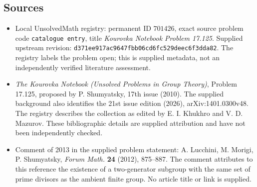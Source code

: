 \documentclass[11pt]{article}
\begin{document}
\subsection{Sources}
\begin{itemize}
\item Local UnsolvedMath registry: permanent ID \(701426\), exact source problem code \texttt{catalogue entry}, title \emph{Kourovka Notebook Problem 17.125}. Supplied upstream revision: \texttt{d371ee917ac9647fbb06cd6fc529deec6f3dda82}. The registry labels the problem open; this is supplied metadata, not an independently verified literature assessment.
\item \emph{The Kourovka Notebook (Unsolved Problems in Group Theory)}, Problem 17.125, proposed by P. Shumyatsky, 17th issue (2010). The supplied background also identifies the 21st issue edition (2026), arXiv:1401.0300v48. The registry describes the collection as edited by E. I. Khukhro and V. D. Mazurov. These bibliographic details are supplied attribution and have not been independently checked.
\item Comment of 2013 in the supplied problem statement: A. Lucchini, M. Morigi, P. Shumyatsky, \emph{Forum Math.} \textbf{24} (2012), 875--887. The comment attributes to this reference the existence of a two-generator subgroup with the same set of prime divisors as the ambient finite group. No article title or link is supplied.
\end{itemize}
\end{document}

